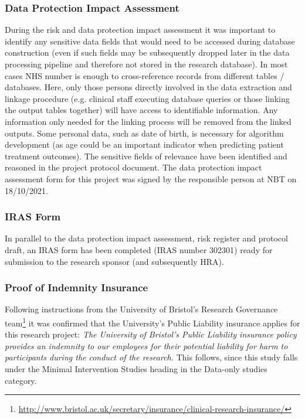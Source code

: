 \documentclass{article}
\begin{document}
\subsubsection{Data Protection Impact Assessment}


During the risk and data protection impact assessment it was important to identify any
sensitive data fields that would need to be accessed during database
construction (even if such fields may be subsequently dropped later in
the data processing pipeline and therefore not stored in the research
database). In most cases NHS number is enough to cross-reference
records from different tables / databases.
Here, only those persons directly involved in the data extraction and
linkage procedure (e.g. clinical staff executing database queries or
those linking the output tables together) will have access to
identifiable information. Any information only needed for the linking
process will be removed from the linked outputs. Some personal data,
such as date of birth, is necessary for algorithm development (as age
could be an important indicator when predicting patient treatment
outcomes). The sensitive fields of relevance have been identified and
reasoned in the project protocol document. The data protection impact
assessment form for this project was signed by the responsible person
at NBT on
18/10/2021.\\

\subsubsection{IRAS Form}

In parallel to the data protection impact assessment, risk register
and protocol draft, an IRAS form has been completed (IRAS number 302301) ready for
submission to the research sponsor (and subsequently HRA). \\

\subsubsection{Proof of Indemnity Insurance}

Following instructions from the University of Bristol's Research
Governance
team\footnote{\url{http://www.bristol.ac.uk/secretary/insurance/clinical-research-insurance/}}
it was confirmed that the University's Public Liability insurance
applies for this research project: \textit{The University of Bristol's
  Public Liability insurance policy provides an indemnity to our
  employees for their potential liability for harm to participants
  during the conduct of the research.}
This follows, since this study falls under the Minimal Intervention Studies heading in the Data-only studies category. \\
\end{document}
